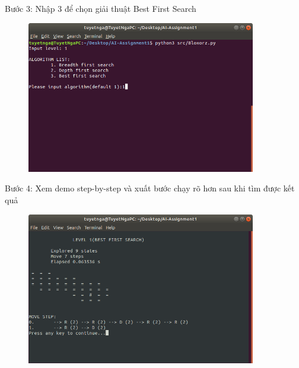\documentclass[a4paper]{article}
\begin{document}
\newpage
\begin{flushleft}
	\hspace{3 cm} Bước 3: Nhập 3 để chọn giải thuật Best First Search
\end{flushleft}
\begin{center}
	\begin{figure}[htp]
		\begin{center}
			\includegraphics[width=10cm]{Images/breadth1.png}
		\end{center}
		\caption{\label{fig:best1}}
	\end{figure}
\end{center}
\begin{flushleft}
	\hspace{2 cm}	Bước 4: Xem demo step-by-step và xuất bước chạy rõ hơn sau khi tìm được kết quả
\end{flushleft}
\begin{center}
	\begin{figure}[htp]
		\begin{center}
			\includegraphics[width=10cm]{Images/best3.png}
		\end{center}
		\caption{\label{fig:best3}}
	\end{figure}
\end{center}
\newpage
\end{document}
